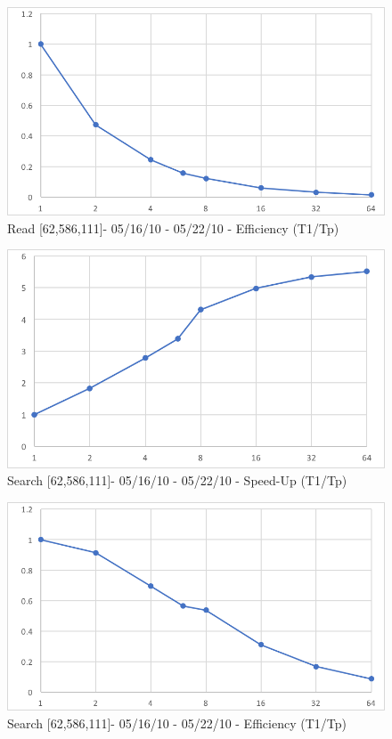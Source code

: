 \documentclass[12pt]{article} %
\begin{document}
\begin{figure}[htb]
\caption{Read [62,586,111]- 05/16/10 - 05/22/10 - Efficiency (T1/Tp)}\label{fig:benchmark01}
\centering
\includegraphics[width=15cm,keepaspectratio]{imgs/img08.png}
\end{figure} 

\begin{figure}[htb]
\caption{Search [62,586,111]- 05/16/10 - 05/22/10 - Speed-Up (T1/Tp)}\label{fig:benchmark01}
\centering
\includegraphics[width=15cm,keepaspectratio]{imgs/img09.png}
\end{figure} 

\begin{figure}[htb]
\caption{Search [62,586,111]- 05/16/10 - 05/22/10 - Efficiency (T1/Tp)}\label{fig:benchmark01}
\centering
\includegraphics[width=15cm,keepaspectratio]{imgs/img10.png}
\end{figure} 
\end{document}
